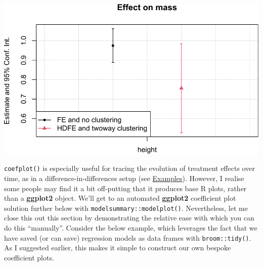 \documentclass[
]{article}
\begin{document}
\includegraphics{11-panel-twfe_files/figure-latex/coefplot-1.pdf}

\texttt{coefplot()} is especially useful for tracing the evolution of
treatment effects over time, as in a difference-in-differences setup
(see
\href{https://lrberge.github.io/fixest/reference/coefplot.html\#examples}{Examples}).
However, I realise some people may find it a bit off-putting that it
produces base R plots, rather than a \textbf{ggplot2} object. We'll get
to an automated \textbf{ggplot2} coefficient plot solution further below
with \texttt{modelsummary::modelplot()}. Nevertheless, let me close this
out this section by demonstrating the relative ease with which you can
do this ``manually''. Consider the below example, which leverages the
fact that we have saved (or can save) regression models as data frames
with \texttt{broom::tidy()}. As I suggested earlier, this makes it
simple to construct our own bespoke coefficient plots.
\end{document}
